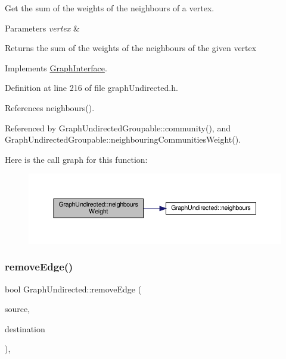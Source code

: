 Get the sum of the weights of the neighbours of a vertex. 


\begin{DoxyParams}{Parameters}
{\em vertex} & \\
\hline
\end{DoxyParams}
\begin{DoxyReturn}{Returns}
the sum of the weights of the neighbours of the given vertex 
\end{DoxyReturn}


Implements \hyperlink{classGraphInterface_a62e1ed1899155eb63cf7ee82970cd415}{Graph\+Interface}.



Definition at line 216 of file graph\+Undirected.\+h.



References neighbours().



Referenced by Graph\+Undirected\+Groupable\+::community(), and Graph\+Undirected\+Groupable\+::neighbouring\+Communities\+Weight().

Here is the call graph for this function\+:
\nopagebreak
\begin{figure}[H]
\begin{center}
\leavevmode
\includegraphics[width=350pt]{classGraphUndirected_aa6c4a4b19efb152de6cdc21d67ac5eed_cgraph}
\end{center}
\end{figure}
\mbox{\label{classGraphUndirected_af4a40541132a66c9b688a20958057751}} 
\subsubsection{\texorpdfstring{remove\+Edge()}{removeEdge()}\hspace{0.1cm}{\footnotesize\ttfamily [1/2]}}
{\footnotesize\ttfamily bool Graph\+Undirected\+::remove\+Edge (\begin{DoxyParamCaption}\item[{const \hyperlink{edge_8h_a5fbd20c46956d479cb10afc9855223f6}{type\+Vertex} \&}]{source,  }\item[{const \hyperlink{edge_8h_a5fbd20c46956d479cb10afc9855223f6}{type\+Vertex} \&}]{destination }\end{DoxyParamCaption})\hspace{0.3cm}{\ttfamily [inline]}, {\ttfamily [virtual]}}

